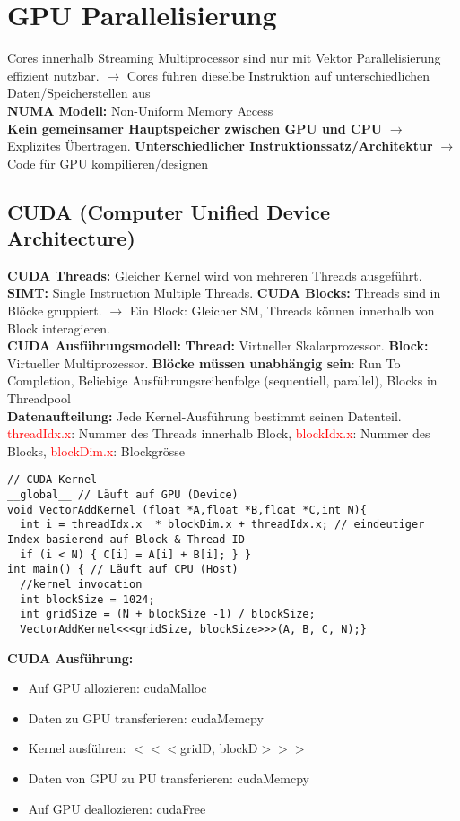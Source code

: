 
\section{GPU Parallelisierung}
Cores innerhalb Streaming Multiprocessor sind nur mit Vektor Parallelisierung
effizient nutzbar. $\rightarrow$ Cores führen dieselbe Instruktion auf unterschiedlichen Daten/Speicherstellen aus\\
\textcolor{b}{\textbf{NUMA Modell:}} Non-Uniform Memory Access\\
\textbf{Kein gemeinsamer Hauptspeicher zwischen GPU und CPU} $\rightarrow$ Explizites Übertragen. \textbf{Unterschiedlicher Instruktionssatz/Architektur} $\rightarrow$ Code für GPU kompilieren/designen
\subsection{CUDA (Computer Unified Device Architecture)}
\textbf{CUDA Threads:} Gleicher Kernel wird von mehreren Threads ausgeführt. \textbf{SIMT:} Single Instruction Multiple Threads. \textbf{CUDA Blocks:} Threads sind in Blöcke gruppiert. $\rightarrow$ Ein Block: Gleicher SM, Threads können innerhalb von Block interagieren.\\
\textcolor{b}{\textbf{CUDA Ausführungsmodell:}} \textbf{Thread:} Virtueller Skalarprozessor. \textbf{Block:} Virtueller Multiprozessor. \textbf{Blöcke müssen unabhängig sein}: Run To Completion, Beliebige Ausführungsreihenfolge (sequentiell, parallel), Blocks in Threadpool\\
\textcolor{b}{\textbf{Datenaufteilung:}} Jede Kernel-Ausführung bestimmt seinen Datenteil. \textcolor{red}{threadIdx.x}: Nummer des Threads innerhalb Block, \textcolor{red}{blockIdx.x}: Nummer des Blocks, \textcolor{red}{blockDim.x}: Blockgrösse
\begin{lstlisting}
// CUDA Kernel
__global__ // Läuft auf GPU (Device)
void VectorAddKernel (float *A,float *B,float *C,int N){
  int i = threadIdx.x  * blockDim.x + threadIdx.x; // eindeutiger Index basierend auf Block & Thread ID
  if (i < N) { C[i] = A[i] + B[i]; } }
int main() { // Läuft auf CPU (Host)
  //kernel invocation
  int blockSize = 1024;
  int gridSize = (N + blockSize -1) / blockSize;
  VectorAddKernel<<<gridSize, blockSize>>>(A, B, C, N);}
\end{lstlisting}
\textcolor{b}{\textbf{CUDA Ausführung:}}
\begin{itemize}[topsep=0pt, leftmargin=3mm]
    \setlength\itemsep{-0.3em}
    \item Auf GPU allozieren: cudaMalloc
    \item Daten zu GPU transferieren: cudaMemcpy
    \item Kernel ausführen: $<<<$gridD, blockD$>>>$
    \item Daten von GPU zu PU transferieren: cudaMemcpy
    \item Auf GPU deallozieren: cudaFree
\end{itemize}
